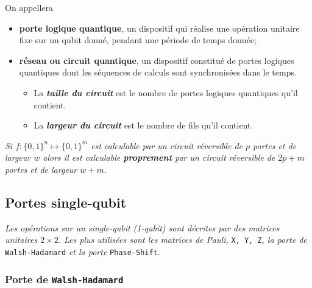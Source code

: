 On appellera
\begin{itemize}
\item \textbf{porte logique quantique}, un dispositif qui réalise une
opération unitaire fixe sur un qubit donné, pendant une période de temps donnée;

\item \textbf{réseau ou circuit quantique}, un dispositif constitué de portes
logiques quantiques dont les séquences de calculs sont synchronisées dans le
temps.
\begin{itemize}
\item La \textbf{\emph{taille du circuit}} est le nombre de portes logiques
quantiques qu'il contient.
\item La \textbf{\emph{largeur du circuit}} est le nombre de fils qu'il
contient.
\end{itemize}
\end{itemize}

\medskip\colorbox[gray]{0.8}{
\parbox[c]{0.9\textwidth}{
\emph{Si $f:\{0,1\}^n\mapsto \{0,1\}^{m}$ est calculable
par un circuit réversible de $p$ portes et de largeur $w$ alors il est
calculable \textbf{proprement} par un circuit réversible de $2p + m$ portes et
de largeur $w + m$.}
}}

\subsection{Portes single-qubit}

\emph{Les opérations sur un single-qubit (1-qubit) sont décrites par des
matrices unitaires $2\times2$. Les plus utilisées sont les matrices de Pauli,}
\texttt{X, Y, Z}\emph{, la porte de} \texttt{Walsh-Hadamard} \emph{et la porte}
\texttt{Phase-Shift}.

\subsubsection{Porte de \texttt{Walsh-Hadamard}}

